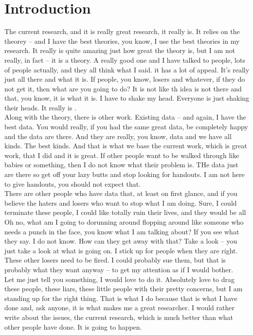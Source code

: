 \chapter{Introduction}
The current research, and it is really great research, it really is. It relies on the theorey -- and I have the best theories, you know, I use the best theories in my research. It really is quite amazing just how great the theory is, but I am not really, in fact -- it is a theory. A really good one and I have talked to people, lots of people actually, and they all think what I said. it has a lot of appeal. It's really just all there and what it is. If people, you know, losers and whatever, if they do not get it, then what are you going to do? It is not like th idea is not there and that, you know, it is what it is. I have to shake my head. Everyone is just shaking their heads. It really is \cite{Trump2016}. \\[0.5cm]
Along with the theory, there is other work. Existing data  -- and again, I have the best data. You would really, if you had the same great data, be completely happy and the data are there. And they are really, you know, data and we have all kinds. The best kinds. And that is what we base the current work, which is great work, that I did and it is great. If other people want to be walked through like babies or something, then I do not know what their problem is. THe data just are there so get off your lazy butts and stop looking for handouts. I am not here to give handouts, you should not expect that. \\[0.5cm]
There are other people who have data that, at least on first glance, and if you believe the haters and losers who want to stop what I am doing. Sure, I could terminate these people, I could like totally ruin their lives, and they would be all \glqq Oh no, what am I going to do\grqq running around flopping around like someone who needs a punch in the face, you know what I am talking about? If you see what they say. I do not know. How can they get away with that? Take a look -- you just take a look at what is going on. I stick up for people when they are right. These other losers need to be fired. I could probably sue them, but that is probably what they want anyway -- to get my attention as if I would bother.\\[0.5cm]
Let me just tell you something, I would love to do it. Absolutely love to drag these people, these liars, these little people with their pretty concerns, but I am standing up for the right thing. That is what I do because that is what I have done and, ask anyone, it is what makes me a great researcher. I would rather write about the issues, the current research, which is much better than what other people have done. It is going to happen.

